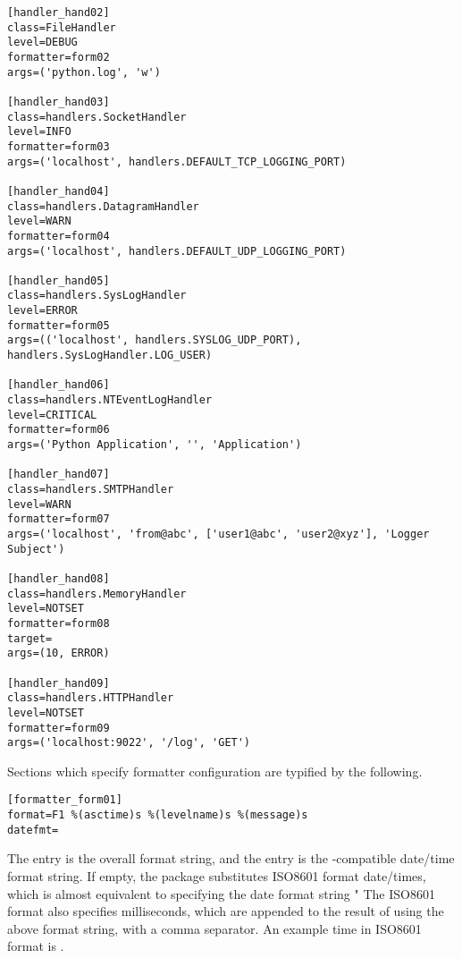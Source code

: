 \begin{verbatim}
[handler_hand02]
class=FileHandler
level=DEBUG
formatter=form02
args=('python.log', 'w')

[handler_hand03]
class=handlers.SocketHandler
level=INFO
formatter=form03
args=('localhost', handlers.DEFAULT_TCP_LOGGING_PORT)

[handler_hand04]
class=handlers.DatagramHandler
level=WARN
formatter=form04
args=('localhost', handlers.DEFAULT_UDP_LOGGING_PORT)

[handler_hand05]
class=handlers.SysLogHandler
level=ERROR
formatter=form05
args=(('localhost', handlers.SYSLOG_UDP_PORT), handlers.SysLogHandler.LOG_USER)

[handler_hand06]
class=handlers.NTEventLogHandler
level=CRITICAL
formatter=form06
args=('Python Application', '', 'Application')

[handler_hand07]
class=handlers.SMTPHandler
level=WARN
formatter=form07
args=('localhost', 'from@abc', ['user1@abc', 'user2@xyz'], 'Logger Subject')

[handler_hand08]
class=handlers.MemoryHandler
level=NOTSET
formatter=form08
target=
args=(10, ERROR)

[handler_hand09]
class=handlers.HTTPHandler
level=NOTSET
formatter=form09
args=('localhost:9022', '/log', 'GET')
\end{verbatim}

Sections which specify formatter configuration are typified by the following.

\begin{verbatim}
[formatter_form01]
format=F1 %(asctime)s %(levelname)s %(message)s
datefmt=
\end{verbatim}

The  entry is the overall format string, and the
 entry is the -compatible date/time format
string. If empty, the package substitutes ISO8601 format date/times, which
is almost equivalent to specifying the date format string "%
The ISO8601 format also specifies milliseconds, which are appended to the
result of using the above format string, with a comma separator. An example
time in ISO8601 format is .
